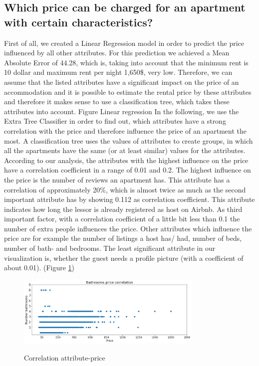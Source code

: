 \documentclass[journal]{IEEEtran}
\begin{document}
\subsection{Which price can be charged for an apartment with certain characteristics?}
First of all, we created a Linear Regression model in order to predict the price influenced by all other attributes. For this prediction we achieved a Mean Absolute Error of 44.28, which is, taking into account that the minimum rent is 10 dollar and maximum rent per night 1,650\$, very low. Therefore, we can assume that the listed attributes have a significant impact on the price of an accommodation and it is possible to estimate the rental price by these attributes and therefore it makes sense to use a classification tree, which takes these attributes into account.
Figure Linear regression
In the following, we use the Extra Tree Classifier in order to find out, which attributes have a strong correlation with the price and therefore influence the price of an apartment the most. A classification tree uses the values of attributes to create groups, in which all the apartments have the same (or at least similar) values for the attributes. According to our analysis, the attributes with the highest influence on the price have a correlation coefficient in a range of 0.01 and 0.2. The highest influence on the price is the number of reviews an apartment has. This attribute has a correlation of approximately 20\%, which is almost twice as much as the second important attribute has by showing 0.112 as correlation coefficient. This attribute indicates how long the lessor is already registered as host on Airbnb. As third important factor, with a correlation coefficient of a little bit less than 0.1 the number of extra people influences the price. Other attributes which influence the price are for example the number of listings a host has/ had, number of beds, number of bath- and bedrooms. The least significant attribute in our visualization is, whether the guest needs a profile picture (with a coefficient of about 0.01). (Figure \ref{correlation-attribute-price})
\begin{figure}
  \begin{center}
  \includegraphics[width=3.5in]{photo/9_bathroom_price_correlation.png}\\
  \caption{Correlation attribute-price}\label{correlation-attribute-price}
  \end{center}
\end{figure}
\end{document}
